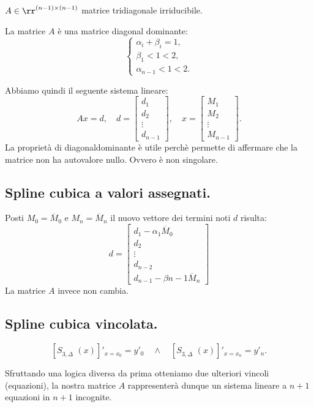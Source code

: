 $A \in \rr^{(n-1)\times(n-1)}$ matrice tridiagonale irriducibile.

\begin{osse}
La matrice $A$ è una matrice diagonal dominante:
\[
\left\{ \begin{array}{l}
\alpha_i + \beta_i = 1, \\
\beta_1 < 1 < 2,\\
\alpha_{n-1} < 1 < 2.
\end{array}\right.
\]
\end{osse}

Abbiamo quindi il seguente sistema lineare:
\[
Ax = d, \quad d = \left[\begin{array}{c}
d_1 \\
d_2 \\
\vdots \\
d_{n-1}
\end{array}
\right], \quad 
x = \left[\begin{array}{c}
M_1 \\
M_2 \\
\vdots \\
M_{n-1}
\end{array}
\right].
\]
La proprietà di diagonaldominante è utile perchè permette di affermare che la
matrice non ha autovalore nullo. Ovvero è non singolare.

\subsection{Spline cubica a valori assegnati.}
Posti $M_0 = \overline{M}_0$ e $M_n = \overline{M}_n$ il nuovo vettore dei
termini noti $d$ risulta:
\[
d = \left[\begin{array}{l}
d_1 -  \alpha_1\overline{M}_0\\
d_2 \\
\vdots \\
d_{n-2}\\
d_{n-1} - \beta{n-1}\overline{M}_n
\end{array}
\right]
\]
La matrice $A$ invece non cambia.

\subsection{Spline cubica vincolata.}
\[
\left[S_{3,\Delta}^{\phantom{(1)}}(x) \right]'_{x = x_0}= y'_0 
\quad \wedge \quad  \left[S_{3,\Delta}^{\phantom{(1)}}(x) \right]'_{x = x_n} = y'_n.
\]

Sfruttando una logica diversa da prima
otteniamo due ulteriori vincoli (equazioni), la nostra matrice $A$ 
rappresenterà dunque un sistema lineare a $n+1$ equazioni in $n+1$ incognite.

